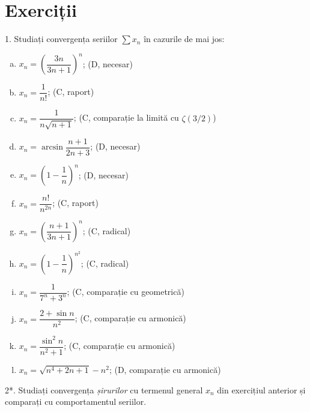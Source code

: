 \section{Exerciții}

1. Studiați convergența seriilor $ \sum x_n $ în cazurile de mai jos:
\begin{enumerate}[(a)]
    \item $ x_n = \left( \dfrac{3n}{3n + 1} \right)^n $; \hfill(D, necesar)
    \item $ x_n = \dfrac{1}{n!} $; \hfill(C, raport)
    \item $ x_n = \dfrac{1}{n\sqrt{n + 1}} $; \hfill(C, comparație la limită cu $\zeta(3/2)$)
    \item $ x_n = \arcsin \dfrac{n+1}{2n + 3} $; \hfill(D, necesar)
    \item $ x_n = \left( 1 - \dfrac{1}{n} \right)^n $; \hfill(D, necesar)
    \item $ x_n = \dfrac{n!}{n^{2n}} $; \hfill(C, raport)
    \item $ x_n = \left( \dfrac{n + 1}{3n + 1}\right)^n $; \hfill(C, radical)
    \item $ x_n = \left( 1 - \dfrac{1}{n} \right)^{n^2} $; \hfill(C, radical)
    \item $ x_n = \dfrac{1}{7^n + 3^n} $; \hfill(C, comparație cu geometrică)
    \item $ x_n = \dfrac{2 + \sin n}{n^2} $; \hfill(C, comparație cu armonică)
    \item $ x_n = \dfrac{\sin^2 n}{n^2 + 1} $; \hfill(C, comparație cu armonică)
    \item $ x_n = \sqrt{n^4 + 2n + 1} - n^2 $; \hfill(D, comparație cu armonică)
\end{enumerate}

2*. Studiați convergența \emph{șirurilor} cu termenul general $ x_n $ din
exercițiul anterior și comparați cu comportamentul seriilor.

